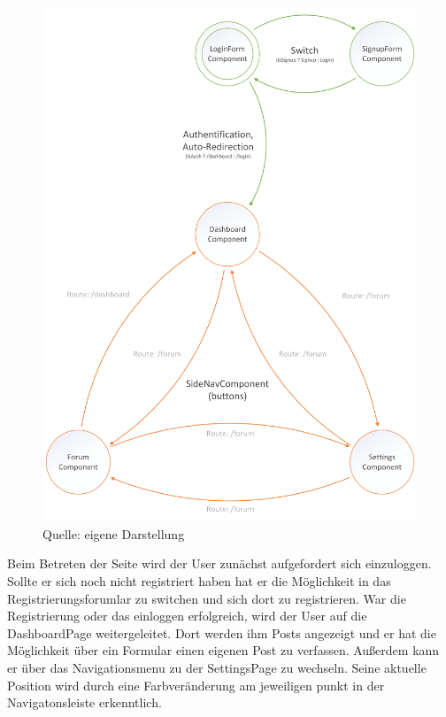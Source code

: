 \documentclass[12pt,titlepage]{article}
\begin{document}
\begin{figure}[hbt!]
\centering
\includegraphics [width=400pt]{Konzepte/bibnow_Navigationskonzept}
\caption[Navigationskonzept]{Quelle: eigene Darstellung}
\end{figure}


\vspace{2cm}


Beim Betreten der Seite wird der User zunächst aufgefordert sich einzuloggen. Sollte er sich noch nicht registriert haben hat er die Möglichkeit in das Registrierungsforumlar zu switchen und sich dort zu registrieren. War die Registrierung oder das einloggen erfolgreich, wird der User auf die DashboardPage weitergeleitet. Dort werden ihm Posts angezeigt und er hat die Möglichkeit über ein Formular einen eigenen Post zu verfassen. Außerdem kann er über das Navigationsmenu zu der SettingsPage zu wechseln. Seine aktuelle Position wird durch eine Farbveränderung am jeweiligen punkt in der Navigatonsleiste erkenntlich.
\end{document}
